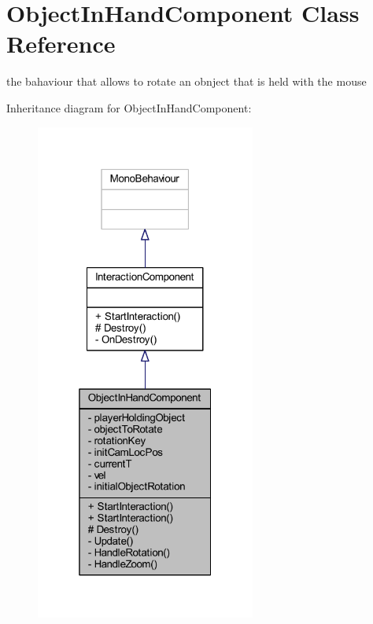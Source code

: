 \hypertarget{class_object_in_hand_component}{}\section{Object\+In\+Hand\+Component Class Reference}
\label{class_object_in_hand_component}


the bahaviour that allows to rotate an obnject that is held with the mouse  




Inheritance diagram for Object\+In\+Hand\+Component\+:
\nopagebreak
\begin{figure}[H]
\begin{center}
\leavevmode
\includegraphics[width=205pt]{class_object_in_hand_component__inherit__graph}
\end{center}
\end{figure}



